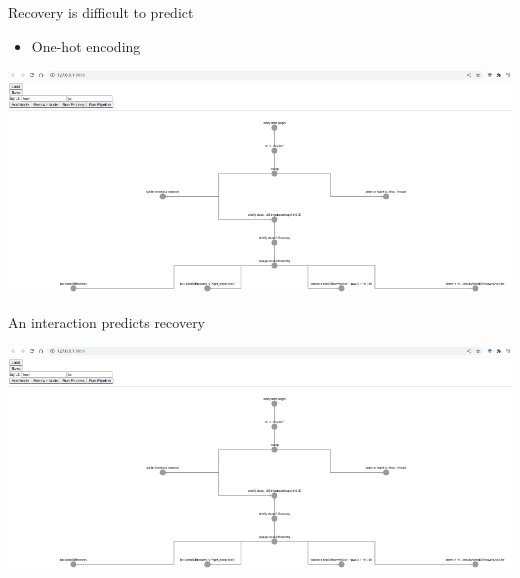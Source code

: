 \documentclass{beamer}
\begin{document}
\begin{frame}{Recovery is difficult to predict}
\begin{itemize}
  \item One-hot encoding
\end{itemize}
\begin{center}
  \includegraphics[width=\linewidth]{figures/examplebrowser.pdf}
\end{center}
\end{frame}

\begin{frame}{An interaction predicts recovery}
\begin{center}
  \includegraphics[width=\linewidth]{figures/examplebrowser.pdf}
\end{center}
\end{frame}
\end{document}
